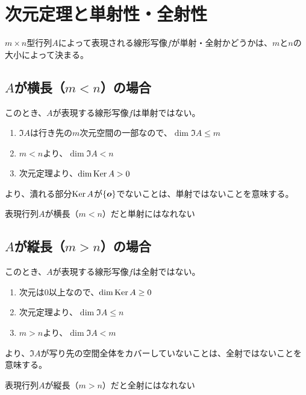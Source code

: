 \documentclass[../../../topic_linear-algebra]{subfiles}
\begin{document}
\sectionline
\section{次元定理と単射性・全射性}

$m \times n$型行列$A$によって表現される線形写像$f$が単射・全射かどうかは、$m$と$n$の大小によって決まる。

\subsection{$A$が横長（$m < n$）の場合}

このとき、$A$が表現する線形写像$f$は単射ではない。

\begin{enumerate}
  \item $\Im A$は行き先の$m$次元空間の一部なので、$\dim \Im A \leq m$
  \item $m < n$より、$\dim \Im A < n$
  \item 次元定理より、$\dim \operatorname{Ker} A > 0$
\end{enumerate}

より、潰れる部分$\operatorname{Ker} A$が$\{ \vb*{o} \}$でないことは、単射ではないことを意味する。

\begin{emphabox}
  \begin{spacebox}
    \begin{center}
      表現行列$A$が横長（$m < n$）だと単射にはなれない
    \end{center}
  \end{spacebox}
\end{emphabox}

\subsection{$A$が縦長（$m > n$）の場合}

このとき、$A$が表現する線形写像$f$は全射ではない。

\begin{enumerate}
  \item 次元は$0$以上なので、$\dim \operatorname{Ker} A \geq 0$
  \item 次元定理より、$\dim \Im A \leq n$
  \item $m > n$より、$\dim \Im A < m$
\end{enumerate}

より、$\Im A$が写り先の空間全体をカバーしていないことは、全射ではないことを意味する。

\begin{emphabox}
  \begin{spacebox}
    \begin{center}
      表現行列$A$が縦長（$m > n$）だと全射にはなれない
    \end{center}
  \end{spacebox}
\end{emphabox}
\end{document}
